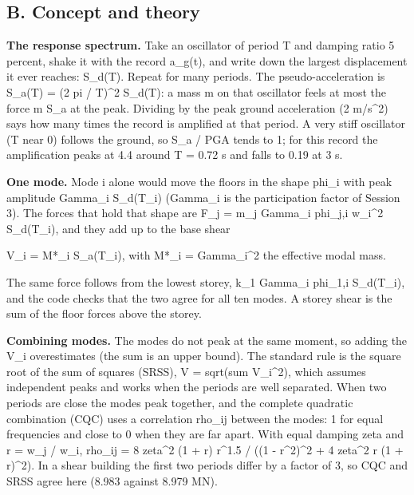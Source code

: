 \documentclass[11pt,a4paper]{article}
\begin{document}
\subsection*{B. Concept and theory}
\textbf{The response spectrum.} Take an oscillator of period T and damping ratio 5 percent, shake it with the record a\_g(t), and write down the largest displacement it ever reaches: S\_d(T). Repeat for many periods. The pseudo-acceleration is S\_a(T) = (2 pi / T)\textasciicircum{}2 S\_d(T): a mass m on that oscillator feels at most the force m S\_a at the peak. Dividing by the peak ground acceleration (2 m/s\textasciicircum{}2) says how many times the record is amplified at that period. A very stiff oscillator (T near 0) follows the ground, so S\_a / PGA tends to 1; for this record the amplification peaks at 4.4 around T = 0.72 s and falls to 0.19 at 3 s.

\textbf{One mode.} Mode i alone would move the floors in the shape phi\_i with peak amplitude Gamma\_i S\_d(T\_i) (Gamma\_i is the participation factor of Session 3). The forces that hold that shape are F\_j = m\_j Gamma\_i phi\_j,i w\_i\textasciicircum{}2 S\_d(T\_i), and they add up to the base shear

V\_i = M*\_i S\_a(T\_i), with M*\_i = Gamma\_i\textasciicircum{}2 the effective modal mass.

The same force follows from the lowest storey, k\_1 Gamma\_i phi\_1,i S\_d(T\_i), and the code checks that the two agree for all ten modes. A storey shear is the sum of the floor forces above the storey.

\textbf{Combining modes.} The modes do not peak at the same moment, so adding the V\_i overestimates (the sum is an upper bound). The standard rule is the square root of the sum of squares (SRSS), V = sqrt(sum V\_i\textasciicircum{}2), which assumes independent peaks and works when the periods are well separated. When two periods are close the modes peak together, and the complete quadratic combination (CQC) uses a correlation rho\_ij between the modes: 1 for equal frequencies and close to 0 when they are far apart. With equal damping zeta and r = w\_j / w\_i, rho\_ij = 8 zeta\textasciicircum{}2 (1 + r) r\textasciicircum{}1.5 / ((1 - r\textasciicircum{}2)\textasciicircum{}2 + 4 zeta\textasciicircum{}2 r (1 + r)\textasciicircum{}2). In a shear building the first two periods differ by a factor of 3, so CQC and SRSS agree here (8.983 against 8.979 MN).
\end{document}

